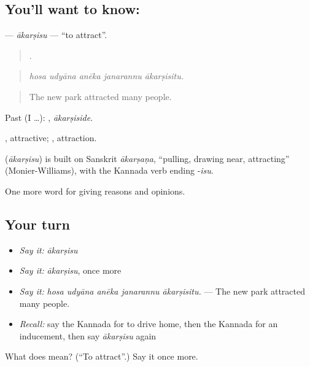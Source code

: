 \subsection*{You'll want to know: }
\textbf{} — \emph{ākarṣisu} — \textquotedblleft{}to attract\textquotedblright{}.

\begin{quote}
    .
\end{quote}

\begin{quote}
\emph{hosa udyāna anēka janarannu ākarṣisitu.}
\end{quote}

\begin{quote}
The new park attracted many people.
\end{quote}

Past (I …): , \emph{ākarṣiside}.

, attractive; , attraction.

\begin{cousinweb}
\textbf{} (\emph{ākarṣisu}) is built on Sanskrit \emph{ākarṣaṇa}, \textquotedblleft{}pulling, drawing near, attracting\textquotedblright{} (Monier-Williams), with the Kannada verb ending -\emph{isu}.
\end{cousinweb}

\begin{grammarlens}[title={What you've built}]
One more word for giving reasons and opinions.
\end{grammarlens}

\subsection*{Your turn}
\begin{itemize}
\raggedright
  \item \emph{Say it:} \emph{ākarṣisu}
  \item \emph{Say it:} \emph{ākarṣisu}, once more
  \item \emph{Say it:} \emph{hosa udyāna anēka janarannu ākarṣisitu.} — The new park attracted many people.
  \item \emph{Recall:} say the Kannada for to drive home, then the Kannada for an inducement, then say \emph{ākarṣisu} again
\end{itemize}

\begin{tcolorbox}[breakable,colback=teal!4,colframe=teal!35!black,title={Before you move on}]
What does  mean? (\textquotedblleft{}To attract\textquotedblright{}.) Say it once more.
\end{tcolorbox}
